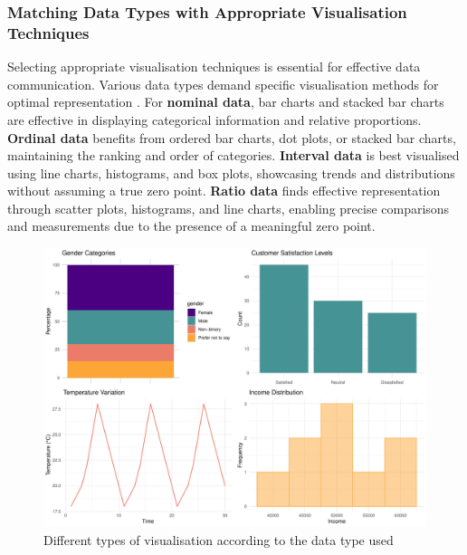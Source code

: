 \documentclass{article}\usepackage[]{graphicx}\usepackage[]{xcolor}
\makeatletter
\def\maxwidth{ %
  \ifdim\Gin@nat@width>\linewidth
    \linewidth
  \else
    \Gin@nat@width
  \fi
}
\newenvironment{knitrout}{}{} %
\makeatother
\begin{document}
\subsubsection{Matching Data Types with Appropriate Visualisation Techniques}

Selecting appropriate visualisation techniques is essential for effective data communication. Various data types demand specific visualisation methods for optimal representation \cite{healy2018data}. For \textbf{nominal data}, bar charts and stacked bar charts are effective in displaying categorical information and relative proportions. \textbf{Ordinal data} benefits from ordered bar charts, dot plots, or stacked bar charts, maintaining the ranking and order of categories. \textbf{Interval data} is best visualised using line charts, histograms, and box plots, showcasing trends and distributions without assuming a true zero point. \textbf{Ratio data} finds effective representation through scatter plots, histograms, and line charts, enabling precise comparisons and measurements due to the presence of a meaningful zero point.

\begin{knitrout}\scriptsize
{}\color{fgcolor}\begin{figure}[H]

{\centering \includegraphics[width=\maxwidth]{figure/beamer-data-plots-1} 

}

\caption[Different types of visualisation according to the data type used]{Different types of visualisation according to the data type used}\label{fig:data-plots}
\end{figure}

\end{knitrout}
\end{document}

